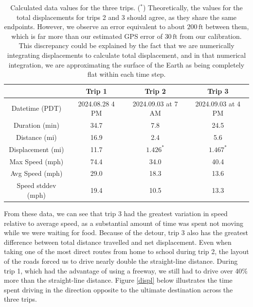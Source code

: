 \documentclass[12pt]{article}
\begin{document}
\begin{table}[h!]
\centering
\begin{tabular}{|c|c|c|c|}
    \hline
     & Trip 1 & Trip 2 & Trip 3  \\
     \hline
     Datetime (PDT) & 2024.08.28 4 PM& 2024.09.03 at 7 AM& 2024.09.03 at 4 PM\\
     \hline
     Duration (min) & 34.7 & 7.8 & 24.5 \\
     \hline
     Distance (mi) &  16.9 & 2.4 & 5.6 \\
     \hline
     Displacement (mi) & 11.7 & $1.426^{*}$ & $1.467^{*}$ \\
     \hline
     Max Speed (mph) & 74.4 & 34.0 & 40.4 \\
     \hline
     Avg Speed (mph) & 29.0 & 18.3 & 13.6 \\
     \hline
     Speed stddev (mph) & 19.4 & 10.5 & 13.3 \\
     \hline
     
\end{tabular}

\caption{Calculated data values for the three trips. ($^{*}$) Theoretically, the values for the total displacements for trips 2 and 3 should agree, as they share the same endpoints. However, we observe an error equivalent to about $200\,\text{ft}$ between them, which is far more than our estimated GPS error of $30\,\text{ft}$ from our calibration. This discrepancy could be explained by the fact that we are numerically integrating displacements to calculate total displacement, and in that numerical integration, we are approximating the surface of the Earth as being completely flat within each time step. }
\label{table:2}
\end{table}

\newpage 
From these data, we can see that trip 3 had the greatest variation in speed relative to average speed, as a substantial amount of time was spent not moving while we were waiting for food. Because of the detour, trip 3 also has the greatest difference between total distance travelled and net displacement. Even when taking one of the most direct routes from home to school during trip 2, the layout of the roads forced us to drive nearly double the straight-line distance. During trip 1, which had the advantage of using a freeway, we still had to drive over 40\% more than the straight-line distance. Figure \ref{displ} below illustrates the time spent driving in the direction opposite to the ultimate destination across the three trips.
\end{document}

